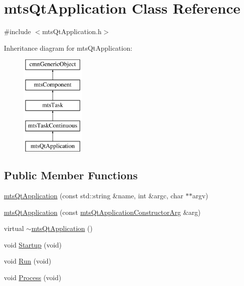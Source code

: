 \hypertarget{classmts_qt_application}{}\section{mts\+Qt\+Application Class Reference}
\label{classmts_qt_application}


{\ttfamily \#include $<$mts\+Qt\+Application.\+h$>$}

Inheritance diagram for mts\+Qt\+Application\+:\begin{figure}[H]
\begin{center}
\leavevmode
\includegraphics[height=5.000000cm]{da/d94/classmts_qt_application}
\end{center}
\end{figure}
\subsection*{Public Member Functions}
\begin{DoxyCompactItemize}
\item 
\hyperlink{classmts_qt_application_aa749bb5ea3701b5fa2b4ec2b61000bfe}{mts\+Qt\+Application} (const std\+::string \&name, int \&argc, char $\ast$$\ast$argv)
\item 
\hyperlink{classmts_qt_application_a157de745735fb13e8c573ebd7c34e2b6}{mts\+Qt\+Application} (const \hyperlink{classmts_qt_application_constructor_arg}{mts\+Qt\+Application\+Constructor\+Arg} \&arg)
\item 
virtual \hyperlink{classmts_qt_application_a1c0802c2d0c84be2dd54e55948c36966}{$\sim$mts\+Qt\+Application} ()
\item 
void \hyperlink{classmts_qt_application_afecfd8a5506b11a74978a26ad89c5b5d}{Startup} (void)
\item 
void \hyperlink{classmts_qt_application_a31e4e1351cf964b479d96e061f2eebac}{Run} (void)
\item 
void \hyperlink{classmts_qt_application_a8b0b20722f39ae35646bef1f2311ea44}{Process} (void)
\end{DoxyCompactItemize}
